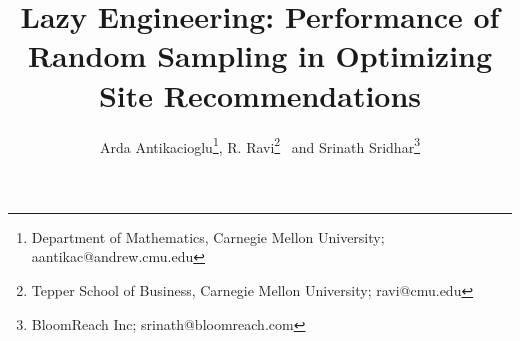 \documentclass[11pt]{article}
\date{}
\begin{document}
\title{Lazy Engineering: Performance of Random Sampling in Optimizing
  Site Recommendations}
\author{Arda Antikacioglu\thanks{Department of Mathematics, Carnegie
    Mellon University; aantikac@andrew.cmu.edu}, 
R. Ravi\thanks{Tepper School of Business, Carnegie Mellon
    University; ravi@cmu.edu} 
~and 
Srinath Sridhar\thanks{BloomReach Inc; srinath@bloomreach.com}}

\maketitle


%







{}

\end{document}
